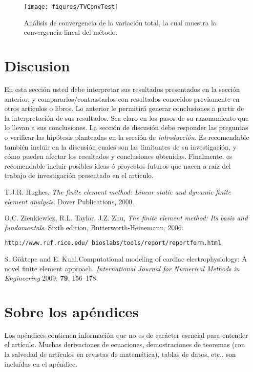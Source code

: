 \documentclass[12pt, letterpaper]{article}
\begin{document}
\begin{figure}[h!]
	\begin{center}
		\texttt{[image: figures/TVConvTest]}
		\caption{An\'alisis de convergencia de la variaci\'on total, la cual muestra la convergencia lineal del m\'etodo.}
		\label{fig:tvconv}
	\end{center}
\end{figure}

\section{Discusion}
En esta secci\'on usted debe interpretar sus resultados presentados en la secci\'on anterior, y compararlos/contrastarlos con resultados conocidos previamente en otros art\'iculos o libros. Lo anterior le permitir\'a generar conclusiones a partir de la interpretaci\'on de sus resultados. Sea claro en los pasos de su razonamiento que lo llevan a sus conclusiones. La secci\'on de discusi\'on debe responder las preguntas o verificar las hip\'otesis planteadas en la secci\'on de {\it introducci\'on}. Es recomendable tambi\'en incluir en la discusi\'on cuales son las limitantes de su investigaci\'on, y c\'omo pueden afectar los resultados y conclusiones obtenidas. Finalmente, es recomendable incluir posibles ideas \'o proyectos futuros que nacen a ra\'iz del trabajo de investigaci\'on presentado en el art\'iculo.


\begin{thebibliography}{10}

  T.J.R. Hughes, \emph{The finite element method: Linear static and dynamic finite element analysis}. Dover Publications, 2000.
  
  O.C. Zienkiewicz, R.L. Taylor, J.Z. Zhu, \emph{The finite element method: Its basis and fundamentals}. Sixth edition, Butterworth-Heinemann, 2006.  

 {\tt http://www.ruf.rice.edu/~bioslabs/tools/report/reportform.html }

	S. G\"{o}ktepe and E. Kuhl.Computational modeling of cardiac electrophysiology: A novel finite element approach. \emph{International Journal for Numerical Methods in Engineering} 2009; {\bf 79}, 156--178.

\end{thebibliography}

\appendix

\section{Sobre los ap\'endices}
	Los ap\'endices contienen informaci\'on que no es de car\'acter esencial para entender el art\'iculo. Muchas derivaciones de ecuaciones, demostraciones de teoremas (con la salvedad de art\'iculos en revistas de matem\'atica), tablas de datos, etc., son inclu\'idas en el ap\'endice.
	
\end{document}
